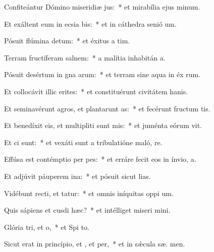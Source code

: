 \item Confiteántur Dómino miseridiæ jus:~* et mirabília ejus  minum.
\item Et exáltent eum in ecsia bis:~* et in cáthedra senió  um.
\item Pósuit flúmina  detum:~* et éxitus a  tim.
\item Terram fructíferam  salnem:~* a malítia inhabitán  a.
\item Pósuit desértum in gna arum:~* et terram sine aqua in éx rum.
\item Et collocávit illic erites:~* et constituérunt civitátem hanis.
\item Et seminavérunt agros, et plantarunt as:~* et fecérunt fructum tis.
\item Et benedíxit eis, et multipliti sunt mis:~* et juménta eórum  vit.
\item Et ci  sunt:~* et vexáti sunt a tribulatióne maló,  re.
\item Effúsa est contémptio per pes:~* et erráre fecit eos in ínvio,    a.
\item Et adjúvit páuperem  ina:~* et pósuit sicut  lias.
\item Vidébunt recti, et tatur:~* et omnis iníquitas oppi  um.
\item Quis sápiens et cusdi hæc?~* et intélliget miseri mini.
\item Glória tri, et o,~* et Spi to.
\item Sicut erat in princípio, et , et per,~* et in sǽcula sæ. men.
